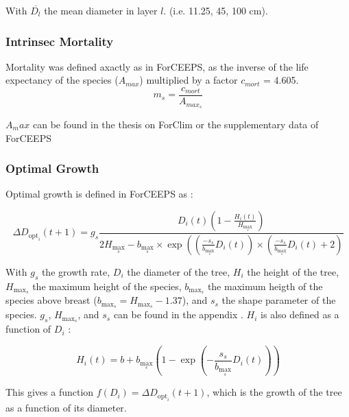 \documentclass{article}
\begin{document}
With $\overline{D_{l}}$ the mean diameter in layer $l$. (i.e. 11.25, 45, 100 cm).\\

\subsubsection{Intrinsec Mortality}

Mortality was defined axactly as in ForCEEPS, as the inverse of the life expectancy of the species ($A_{max}$) multiplied by a factor $c_{mort}$ = 4.605.
\begin{equation}
    m_s = \frac{c_{mort}}{A_{max_s}}
\end{equation}

$A_max$ can be found in the thesis on ForClim  \autocite{bugmannEcologyMountainousForests1965} or the supplementary data of ForCEEPS  \autocite{morinForestSuccessionGap2021}

\subsubsection{Optimal Growth}

Optimal growth is defined in ForCEEPS  \autocite{morinForestSuccessionGap2021} as :

\begin{equation}
    \Delta D_{\mathrm{opt}_i}(t+1)=g_s \frac{D_i(t)\left(1-\frac{H_i(t)}{H_{\max _s}}\right)}{2 H_{\max _s}-b_{\max _s} \times \exp \left(\left(\frac{-s_s}{b_{\max _s}} D_i(t)\right) \times\left(\frac{-s_s}{b_{\max _s}} D_i(t)+2\right)\right.}
\end{equation}

With $g_s$ the growth rate, $D_i$ the diameter of the tree, $H_i$ the height of the tree, $H_{\max _s}$ the maximum height of the species, $b_{\max _s}$ the maximum heigth of the species above breast ($b_{\max _s} =  H_{\max _s} - 1.37$), and $s_s$ the shape parameter of the species. $g_s$, $H_{\max _s}$, and $s_s$ can be found in the appendix  \autocite{morinForestSuccessionGap2021}. $H_i$ is also defined as a function of $D_i$ :

\begin{equation}
    H_i(t)=b+b_{\max _s}\left(1-\exp \left(-\frac{s_s}{b_{\max _s}} D_i(t)\right)\right)
    \label{eq:height}
\end{equation}

This gives a function $f(D_i) = \Delta D_{\mathrm{opt}_i}(t+1)$, which is the growth of the tree as a function of its diameter.
\end{document}
